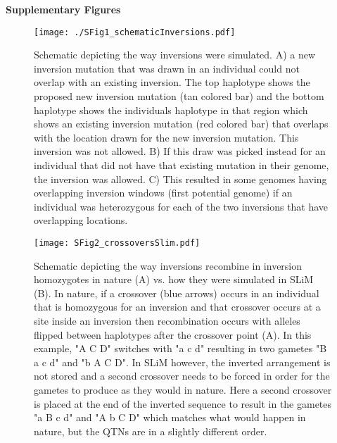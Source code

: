 \documentclass[10pt, scrartlc]{article}
\begin{document}
\pagecolor{white}

\begin{center}
{ \Large \bf Supplementary Figures }
\end{center}

\listoffigures

\clearpage
\newpage

\begin{figure}[h]
	\begin{center}
		\texttt{[image: ./SFig1\_schematicInversions.pdf]}
	\end{center}
	\caption[Supplementary Figure 1: Schematic for Inversion Overlap Dynamics]{Schematic depicting the way inversions were simulated. A) a new inversion mutation that was drawn in an individual could not overlap with an existing inversion. The top haplotype shows the proposed new inversion mutation (tan colored bar) and the bottom haplotype shows the individuals haplotype in that region which shows an existing inversion mutation (red colored bar) that overlaps with the location drawn for the new inversion mutation. This inversion was not allowed. B) If this draw was picked instead for an individual that did not have that existing mutation in their genome, the inversion was allowed. C) This resulted in some genomes having overlapping inversion windows (first potential genome) if an individual was heterozygous for each of the two inversions that have overlapping locations.}
\end{figure}

\begin{figure}[h]
	\begin{center}
		\texttt{[image: SFig2\_crossoversSlim.pdf]}
	\end{center}
	\caption[Supplementary Figure 2: Recombination in Inversion Homozygotes]{Schematic depicting the way inversions recombine in inversion homozygotes in nature (A) vs. how they were simulated in SLiM (B). In nature, if a crossover (blue arrows) occurs in an individual that is homozygous for an inversion and that crossover occurs at a site inside an inversion then recombination occurs with alleles flipped between haplotypes after the crossover point (A). In this example, "A C D" switches with "a c d" resulting in two gametes "B a c d" and "b A C D".  In SLiM however, the inverted arrangement is not stored and a second crossover needs to be forced in order for the gametes to produce as they would in nature. Here a second crossover is placed at the end of the inverted sequence to result in the gametes "a B c d" and "A b C D" which matches what would happen in nature, but the QTNs are in a slightly different order.}
\end{figure}
\end{document}
